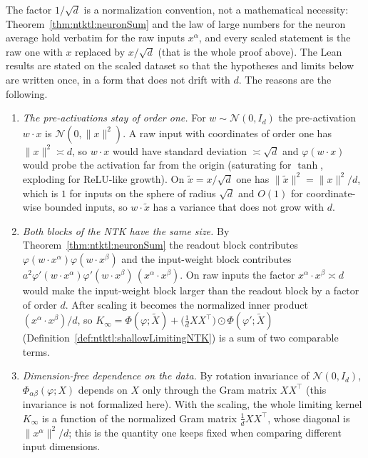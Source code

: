\begin{remark}\label{rmk:ntktl:whyScaled}
The factor $1/\sqrt d$ is a normalization convention, not a mathematical necessity: Theorem~\ref{thm:ntktl:neuronSum} and the law of large numbers for the
neuron average hold verbatim for the raw inputs $x^\alpha$, and every scaled statement is the raw one with $x$ replaced by $x/\sqrt d$ (that is the whole proof above).
The Lean results are stated on the scaled dataset so that the hypotheses and limits below are written once, in a form that does not drift with $d$.
The reasons are the following.
\begin{enumerate}
  \item \emph{The pre-activations stay of order one.} For $w\sim\mathcal N(0,I_d)$ the pre-activation $w\cdot x$ is $\mathcal N(0,\|x\|^2)$. A raw input with
  coordinates of order one has $\|x\|^2\asymp d$, so $w\cdot x$ would have standard deviation $\asymp\sqrt d$ and $\varphi(w\cdot x)$ would probe the
  activation far from the origin (saturating for $\tanh$, exploding for ReLU-like growth). On $\tilde x=x/\sqrt d$ one has $\|\tilde x\|^2=\|x\|^2/d$, which is $1$
  for inputs on the sphere of radius $\sqrt d$ and $O(1)$ for coordinate-wise bounded inputs, so $w\cdot\tilde x$ has a variance that does not grow with $d$.
  \item \emph{Both blocks of the NTK have the same size.} By Theorem~\ref{thm:ntktl:neuronSum} the readout block contributes $\varphi(w\cdot x^\alpha)\varphi(w\cdot x^\beta)$
  and the input-weight block contributes $a^2\varphi'(w\cdot x^\alpha)\varphi'(w\cdot x^\beta)\,(x^\alpha\cdot x^\beta)$. On raw inputs the factor $x^\alpha\cdot x^\beta\asymp d$ would
  make the input-weight block larger than the readout block by a factor of order $d$. After scaling it becomes the normalized inner product
  $(x^\alpha\cdot x^\beta)/d$, so $K_\infty=\Phi(\varphi;\tilde X)+\bigl(\tfrac1dXX^\top\bigr)\odot\Phi(\varphi';\tilde X)$ (Definition~\ref{def:ntktl:shallowLimitingNTK})
  is a sum of two comparable terms.
  \item \emph{Dimension-free dependence on the data.} By rotation invariance of $\mathcal N(0,I_d)$, $\Phi_{\alpha\beta}(\varphi;X)$ depends on $X$ only through the Gram
  matrix $XX^\top$ (this invariance is not formalized here). With the scaling, the whole limiting kernel $K_\infty$ is a function of the normalized Gram matrix
  $\tfrac1dXX^\top$, whose diagonal is $\|x^\alpha\|^2/d$; this is the quantity one keeps fixed when comparing different input dimensions.

\end{enumerate}
\end{remark}
